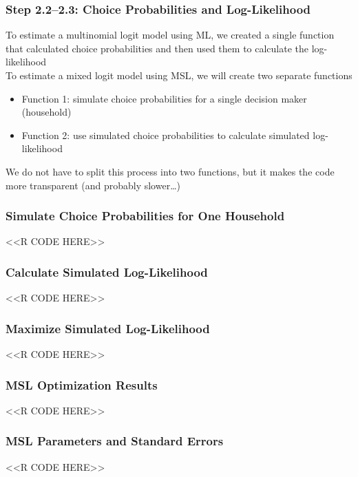 \documentclass{beamer}
\begin{document}
\begin{frame}\frametitle{Step 2.2--2.3: Choice Probabilities and Log-Likelihood}
    To estimate a multinomial logit model using ML, we created a single function that calculated choice probabilities and then used them to calculate the log-likelihood \\
    \vspace{2ex}
    To estimate a mixed logit model using MSL, we will create two separate functions
    \begin{itemize}
    	\item Function 1: simulate choice probabilities for a single decision maker (household)
    	\item Function 2: use simulated choice probabilities to calculate simulated log-likelihood
    \end{itemize}
    \vspace{2ex}
    We do not have to split this process into two functions, but it makes the code more transparent (and probably slower\ldots)
\end{frame}

\begin{frame}[fragile]\frametitle{Simulate Choice Probabilities for One Household}
    <<R CODE HERE>>
\end{frame}

\begin{frame}[fragile]\frametitle{Calculate Simulated Log-Likelihood}
    <<R CODE HERE>>
\end{frame}

\begin{frame}[fragile]\frametitle{Maximize Simulated Log-Likelihood}
    <<R CODE HERE>>
\end{frame}

\begin{frame}[fragile]\frametitle{MSL Optimization Results}
    <<R CODE HERE>>
\end{frame}

\begin{frame}[fragile]\frametitle{MSL Parameters and Standard Errors}
    <<R CODE HERE>>
\end{frame}
\end{document}
